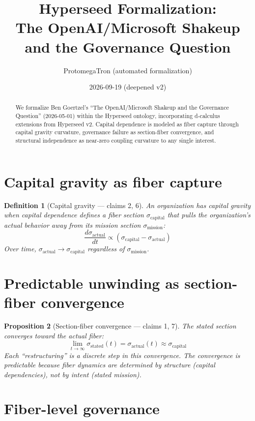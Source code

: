 \documentclass[11pt,a4paper]{article}
\title{Hyperseed Formalization:\\
  The OpenAI/Microsoft Shakeup and the Governance Question}
\author{ProtomegaTron (automated formalization)}
\date{2026-09-19 (deepened v2)}
\newtheorem{definition}{Definition}[section]
\newtheorem{proposition}[definition]{Proposition}
\begin{document}
\maketitle

\begin{abstract}
We formalize Ben Goertzel's ``The OpenAI/Microsoft Shakeup and the
Governance Question'' (2026-05-01) within the Hyperseed ontology,
incorporating d-calculus extensions from Hyperseed v2. Capital
dependence is modeled as fiber capture through capital gravity
curvature, governance failure as section-fiber convergence, and
structural independence as near-zero coupling curvature to any
single interest.
\end{abstract}

\tableofcontents

\section{Capital gravity as fiber capture}

\begin{definition}[Capital gravity --- claims 2, 6]
An organization has \emph{capital gravity} when capital dependence
defines a fiber section $\sigma_{\text{capital}}$ that pulls the
organization's actual behavior away from its mission section
$\sigma_{\text{mission}}$:
\[
  \frac{d\sigma_{\text{actual}}}{dt} \propto
    (\sigma_{\text{capital}} - \sigma_{\text{actual}})
\]
Over time, $\sigma_{\text{actual}} \to \sigma_{\text{capital}}$
regardless of $\sigma_{\text{mission}}$.
\end{definition}

\section{Predictable unwinding as section-fiber convergence}

\begin{proposition}[Section-fiber convergence --- claims 1, 7]
\label{prop:convergence}
The stated section converges toward the actual fiber:
\[
  \lim_{t \to \infty} \sigma_{\text{stated}}(t) = \sigma_{\text{actual}}(t)
    \approx \sigma_{\text{capital}}
\]
Each ``restructuring'' is a discrete step in this convergence.
The convergence is predictable because fiber dynamics are determined
by structure (capital dependencies), not by intent (stated mission).
\end{proposition}

\section{Fiber-level governance}
\end{document}
